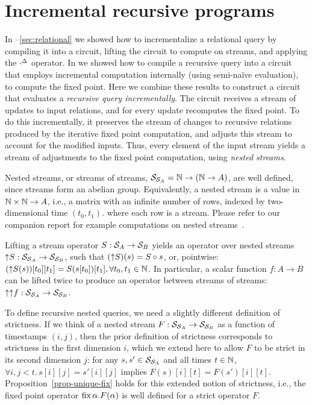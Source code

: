 \section{Incremental recursive programs}\label{sec:nested}

In --\ref{sec:relational} 
we showed how to incrementalize a relational query by
compiling it into a circuit, lifting the circuit to compute on streams, and
applying the ${\cdot}^{\Delta}$ operator.  In  we showed
how to compile a recursive query into a circuit that employs incremental
computation internally (using semi-na\"ive evaluation), to compute the fixed point.
Here we combine these results to construct a circuit that evaluates a \emph{recursive
query incrementally}.  The circuit receives a stream of updates to input
relations, and for every update recomputes the fixed point.  To do this
incrementally, it preserves the stream of changes to recursive relations
produced by the iterative fixed point computation, and adjusts this stream to
account for the modified inputs.  Thus, every element of the input stream yields
a stream of adjustments to the fixed point computation, using
\emph{nested streams}.

Nested streams, or streams of streams, $\mathcal{S}_{\mathcal{S}_{A}} = \mathbb{N} \rightarrow (\mathbb{N}
\rightarrow A)$, are well defined, since streams form an abelian group.
Equivalently, a nested stream is a value in $\mathbb{N} \times \mathbb{N} \to A$, i.e., a matrix
with an infinite number of rows, indexed by two-dimensional time $(t_0, t_1)$. 
where each row is a stream.  Please refer to our companion report for
example computations on nested streams~\cite{tr}.


Lifting a stream operator $S: \mathcal{S}_{A} \to \mathcal{S}_{B}$ yields an operator over
nested streams ${\uparrow}S: \mathcal{S}_{\mathcal{S}_{A}} \to \mathcal{S}_{\mathcal{S}_{B}}$, such
that $({\uparrow}S)(s) = S \circ s$, or, pointwise: $({\uparrow}S(s))[t_0][t_1] =
S(s[t_0])[t_1], \forall t_0, t_1 \in \mathbb{N}$.  In particular, a scalar function $f:
A \rightarrow B$ can be lifted twice to produce an operator between streams of
streams: ${\uparrow}{\uparrow}f: \mathcal{S}_{\mathcal{S}_{A}} \rightarrow \mathcal{S}_{\mathcal{S}_{B}}$.

To define recursive nested queries, we need a slightly different definition of strictness. If we think of a nested stream $F: \mathcal{S}_{\mathcal{S}_{A}} \to \mathcal{S}_{\mathcal{S}_{B}}$ as a function of timestamps $(i, j)$, then the prior definition of strictness corresponds to strictness in the first dimension $i$, which we extend here to allow $F$ to be strict in its second dimension $j$: for any $s, s' \in \mathcal{S}_{\mathcal{S}_{A}}$ and all times $t \in \mathbb{N}$, $\forall i, j < t.\, s[i][j] = s'[i][j]$ implies $F(s)[i][t] = F(s')[i][t]$.
Proposition~\ref{prop-unique-fix} holds for this extended notion of strictness, i.e., the fixed point operator $\mbox{fix}\,\alpha.F(\alpha)$ is well defined for a strict operator $F$.

